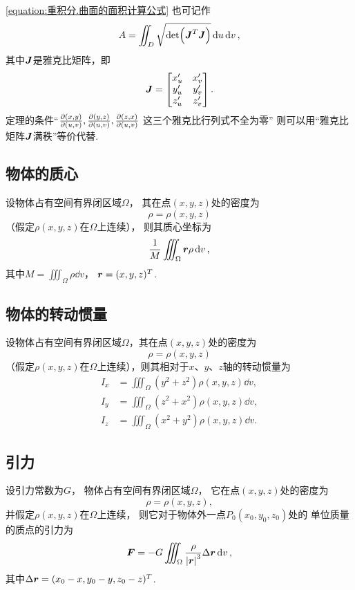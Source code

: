 \cref{equation:重积分.曲面的面积计算公式} 也可记作\[
	A = \iint_D \sqrt{\det(\boldsymbol{J}^T \boldsymbol{J})} \dd{u}\dd{v},
\]
其中\(\boldsymbol{J}\)是雅克比矩阵，即\[
	\boldsymbol{J} = \begin{bmatrix}
		x'_u & x'_v \\
		y'_u & y'_v \\
		z'_u & z'_v
	\end{bmatrix}.
\]
定理的条件“\(\pdv{ (x,y) }{ (u,v) },
\pdv{ (y,z) }{ (u,v) },
\pdv{ (z,x) }{ (u,v) }\)
这三个雅克比行列式不全为零”
则可以用“雅克比矩阵\(\boldsymbol{J}\)满秩”等价代替.

\subsection{物体的质心}
\begin{theorem}
设物体占有空间有界闭区域\(\Omega\)，
其在点\((x,y,z)\)处的密度为\[
	\rho=\rho(x,y,z)
\]
（假定\(\rho(x,y,z)\)在\(\Omega\)上连续），
则其质心坐标为\begin{equation}
	\frac{1}{M} \iiint_{\Omega} \boldsymbol{r} \rho \dd{v},
\end{equation}
其中\(M = \iiint_{\Omega} \rho \dd{v}\)，
\(\boldsymbol{r} = (x,y,z)^T\).
\end{theorem}

\subsection{物体的转动惯量}
\begin{theorem}
设物体占有空间有界闭区域\(\Omega\)，其在点\((x,y,z)\)处的密度为\[
\rho=\rho(x,y,z)
\]（假定\(\rho(x,y,z)\)在\(\Omega\)上连续），则其相对于\(x\)、\(y\)、\(z\)轴的转动惯量为\begin{align}
I_x &= \iiint_{\Omega} (y^2+z^2) \rho(x,y,z) \dd{v}, \\
I_y &= \iiint_{\Omega} (z^2+x^2) \rho(x,y,z) \dd{v}, \\
I_z &= \iiint_{\Omega} (x^2+y^2) \rho(x,y,z) \dd{v}.
\end{align}
\end{theorem}

\subsection{引力}
\begin{theorem}
设引力常数为\(G\)，
物体占有空间有界闭区域\(\Omega\)，
它在点\((x,y,z)\)处的密度为\[
	\rho=\rho(x,y,z),
\]
并假定\(\rho(x,y,z)\)在\(\Omega\)上连续，
则它对于物体外一点\(P_0(x_0,y_0,z_0)\)处的
单位质量的质点的引力为\begin{equation}
	\boldsymbol{F}
	= -G \iiint_\Omega \frac{\rho}{\abs{\boldsymbol{r}}^3} \Delta\boldsymbol{r} \dd{v},
\end{equation}
其中\(\Delta\boldsymbol{r}
= (x_0-x,y_0-y,z_0-z)^T\).
\end{theorem}

